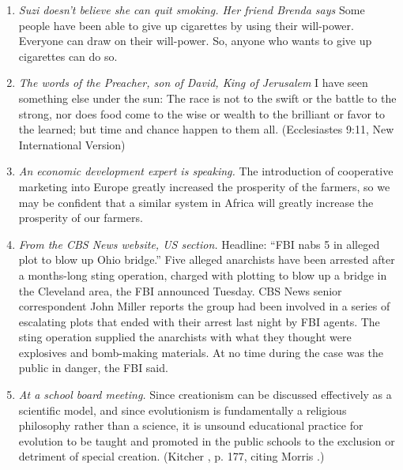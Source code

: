 \begin{enumerate}

\item \textit{Suzi doesn't believe she can quit smoking. Her friend Brenda says} Some people have been able to give up cigarettes by using their will-power. Everyone can draw on their will-power. So, anyone who wants to give up cigarettes can do so.

\item \textit{The words of the Preacher, son of David, King of Jerusalem} I have seen something else under the sun: The race is not to the swift or the battle to the strong, nor does food come to the wise or wealth to the brilliant or favor to the learned; but time and chance happen to them all. (Ecclesiastes 9:11, New International Version)

\item \textit{An economic development expert is speaking.} The introduction of cooperative marketing into Europe greatly increased the prosperity of the farmers, so we may be confident that a similar system in Africa will greatly increase the prosperity of our farmers.

\item \textit{From the CBS News website, US section.} Headline: ``FBI nabs 5 in alleged plot to blow up Ohio bridge.'' Five alleged anarchists have been arrested after a months-long sting operation, charged with plotting to blow up a bridge in the Cleveland area, the FBI announced Tuesday. CBS News senior correspondent John Miller reports the group had been involved in a series of escalating plots that ended with their arrest last night by FBI agents. The sting operation supplied the anarchists with what they thought were explosives and bomb-making materials. At no time during the case was the public in danger, the FBI said. \citep{CBSNews2012}

\item \textit{At a school board meeting.} Since creationism can be discussed effectively as a scientific model, and since evolutionism is fundamentally a religious philosophy rather than a science, it is unsound educational practice for evolution to be taught and promoted in the public schools to the exclusion or detriment of special creation. (Kitcher \cite*{Kitcher1982}, p. 177, citing Morris \cite*{Morris1975}.)

\end{enumerate}
